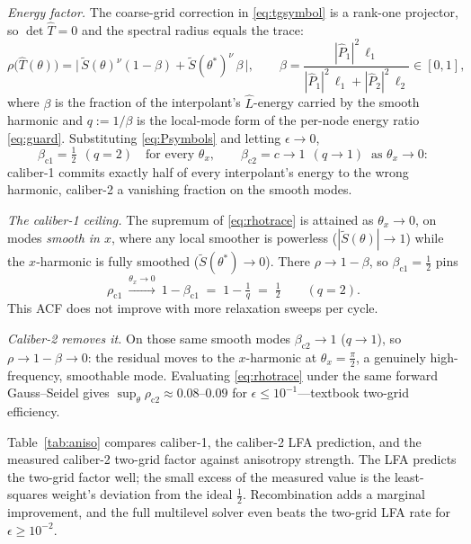 \documentclass{siamart220329}
\begin{document}
\emph{Energy factor.} The coarse-grid correction in \eqref{eq:tgsymbol} is a rank-one projector, so $\det\hat T=0$
and the spectral radius equals the trace:
\begin{equation}\label{eq:rhotrace}
\rho\big(\hat T(\theta)\big)=\big|\,\tilde S(\theta)^{\nu}(1-\beta)+\tilde S(\theta^{\ast})^{\nu}\,\beta\,\big|,
\qquad
\beta=\frac{|\hat P_1|^2\,\ell_1}{|\hat P_1|^2\,\ell_1+|\hat P_2|^2\,\ell_2}\in[0,1],
\end{equation}
where $\beta$ is the fraction of the interpolant's $\hat L$-energy carried by the smooth harmonic and
$q:=1/\beta$ is the local-mode form of the per-node energy ratio \eqref{eq:guard}. Substituting
\eqref{eq:Psymbols} and letting $\epsilon\to0$,
\begin{equation}\label{eq:betas}
\beta_{\mathrm{c1}}=\tfrac12\ \ (q=2)\quad\text{for every }\theta_x,
\qquad
\beta_{\mathrm{c2}}=c\to1\ \ (q\to1)\ \text{ as }\theta_x\to0 :
\end{equation}
caliber-1 commits exactly half of every interpolant's energy to the wrong harmonic, caliber-2 a
vanishing fraction on the smooth modes.

\emph{The caliber-1 ceiling.} The supremum of \eqref{eq:rhotrace} is attained as $\theta_x\to0$, on modes
\emph{smooth in $x$}, where any local smoother is powerless ($|\tilde S(\theta)|\to1$) while the
$x$-harmonic is fully smoothed ($\tilde S(\theta^{\ast})\to0$). There $\rho\to1-\beta$, so
$\beta_{\mathrm{c1}}=\tfrac12$ pins
\begin{equation}\label{eq:c1ceiling}
\rho_{\mathrm{c1}}\ \xrightarrow{\theta_x\to0}\ 1-\beta_{\mathrm{c1}}\;=\;1-\tfrac1q\;=\;\tfrac12\qquad(q=2).
\end{equation}
This ACF does not improve with more relaxation sweeps per cycle.

\emph{Caliber-2 removes it.} On those same smooth modes $\beta_{\mathrm{c2}}\to1$ ($q\to1$), so
$\rho\to1-\beta\to0$: the residual moves to the $x$-harmonic at $\theta_x=\tfrac\pi2$, a genuinely
high-frequency, smoothable mode. Evaluating \eqref{eq:rhotrace} under the same forward Gauss--Seidel
gives $\sup_\theta\rho_{\mathrm{c2}}\approx0.08$--$0.09$ for $\epsilon\le10^{-1}$---textbook two-grid efficiency.

Table~\ref{tab:aniso} compares caliber-1, the caliber-2 LFA prediction, and the measured caliber-2 two-grid factor against anisotropy strength. The LFA predicts the two-grid factor well; the small excess of the measured value is the least-squares weight's deviation from the ideal $\tfrac12$. Recombination adds a marginal improvement, and the full multilevel solver even beats the two-grid LFA rate for $\epsilon\ge10^{-2}$.
\end{document}

